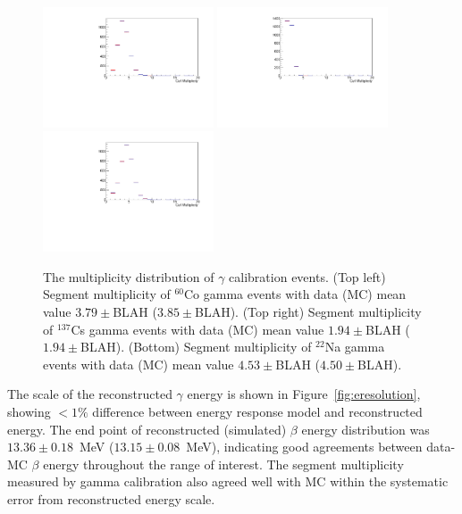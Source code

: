 \documentclass{article}
\begin{document}
\begin{figure}[h!]
\centering
\includegraphics[width=0.45\textwidth]{hCo60multi.pdf}
\includegraphics[width=0.45\textwidth]{hCs137multi.pdf}
\includegraphics[width=0.45\textwidth]{hNa22mulit.pdf}
\caption{The multiplicity distribution of $\gamma$ calibration events. 
(Top left) Segment multiplicity of $^{60}$Co gamma events with data (MC) mean value $3.79\pm$BLAH ($3.85\pm$BLAH). 
(Top right) Segment multiplicity of $^{137}$Cs gamma events with data (MC) mean value $1.94\pm$BLAH ($1.94\pm$BLAH). 
(Bottom) Segment multiplicity of $^{22}$Na gamma events with data (MC) mean value $4.53\pm$BLAH ($4.50\pm$BLAH).}
\label{fig:multi}
\end{figure}

The scale of the reconstructed $\gamma$ energy is shown in Figure~\ref{fig:eresolution}, showing $<1\%$ difference between energy response model and reconstructed energy.
The end point of reconstructed (simulated) $\beta$ energy distribution was $13.36\pm0.18$~MeV ($13.15\pm0.08$~MeV), indicating good agreements between data-MC $\beta$ energy throughout the range of interest.
The segment multiplicity measured by gamma calibration also agreed well with MC within the systematic error from reconstructed energy scale.
\end{document}
